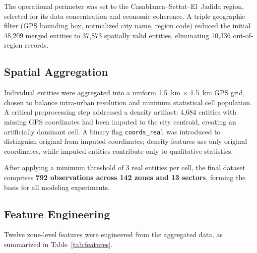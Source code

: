 \documentclass[conference]{IEEEtran}
\begin{document}
The operational perimeter was set to the Casablanca--Settat--El~Jadida
region, selected for its data concentration and economic coherence.
A triple geographic filter (GPS bounding box, normalized city name,
region code) reduced the initial 48,209 merged entities to 37,873
spatially valid entities, eliminating 10,336 out-of-region records.

\subsection{Spatial Aggregation}

Individual entities were aggregated into a uniform 1.5~km $\times$ 1.5~km
GPS grid, chosen to balance intra-urban resolution and minimum
statistical cell population. A critical preprocessing step addressed
a density artifact: 4,684 entities with missing GPS coordinates
had been imputed to the city centroid, creating an artificially dominant
cell. A binary flag \texttt{coords\_real} was introduced to distinguish
original from imputed coordinates; density features use only original
coordinates, while imputed entities contribute only to qualitative statistics.

After applying a minimum threshold of 3 real entities per cell,
the final dataset comprises \textbf{792 observations across 142 zones and 13 sectors},
forming the basis for all modeling experiments.

\subsection{Feature Engineering}

Twelve zone-level features were engineered from the aggregated data,
as summarized in Table~\ref{tab:features}.
\end{document}
